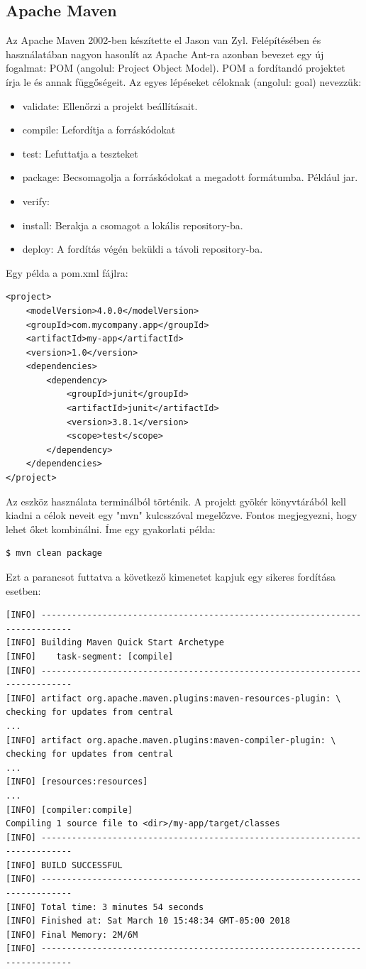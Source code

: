 \documentclass{article}
\begin{document}
\subsection{Apache Maven}\label{subsec:maven}
Az Apache Maven 2002-ben készítette el Jason van Zyl. Felépítésében és használatában nagyon hasonlít az Apache Ant-ra azonban bevezet egy új fogalmat: POM (angolul: Project Object Model). POM a fordítandó projektet írja le és annak függőségeit. Az egyes lépéseket céloknak (angolul: goal) nevezzük:
\begin{itemize}
	\item validate: Ellenőrzi a projekt beállításait.
	\item compile: Lefordítja a forráskódokat
	\item test: Lefuttatja a teszteket
	\item package: Becsomagolja a forráskódokat a megadott formátumba. Például jar.
	\item verify: 
	\item install: Berakja a csomagot a lokális repository-ba.
	\item deploy: A fordítás végén beküldi a távoli repository-ba.
\end{itemize}
Egy példa a pom.xml fájlra:
\begin{lstlisting}
<project>
	<modelVersion>4.0.0</modelVersion>
	<groupId>com.mycompany.app</groupId>
	<artifactId>my-app</artifactId>
	<version>1.0</version>
	<dependencies>
		<dependency>
			<groupId>junit</groupId>
			<artifactId>junit</artifactId>
			<version>3.8.1</version>
			<scope>test</scope>
		</dependency>
	</dependencies>
</project>
\end{lstlisting}
Az eszköz használata terminálból történik. A projekt gyökér könyvtárából kell kiadni a célok neveit egy "mvn" kulcsszóval megelőzve. Fontos megjegyezni, hogy lehet őket kombinálni. Íme egy gyakorlati példa:
\begin{lstlisting}[language=bash]
$ mvn clean package
\end{lstlisting}
Ezt a parancsot futtatva a következő kimenetet kapjuk egy sikeres fordítása esetben: 
\begin{lstlisting}
[INFO] ----------------------------------------------------------------------------
[INFO] Building Maven Quick Start Archetype
[INFO]    task-segment: [compile]
[INFO] ----------------------------------------------------------------------------
[INFO] artifact org.apache.maven.plugins:maven-resources-plugin: \
checking for updates from central
...
[INFO] artifact org.apache.maven.plugins:maven-compiler-plugin: \
checking for updates from central
...
[INFO] [resources:resources]
...
[INFO] [compiler:compile]
Compiling 1 source file to <dir>/my-app/target/classes
[INFO] ----------------------------------------------------------------------------
[INFO] BUILD SUCCESSFUL
[INFO] ----------------------------------------------------------------------------
[INFO] Total time: 3 minutes 54 seconds
[INFO] Finished at: Sat March 10 15:48:34 GMT-05:00 2018
[INFO] Final Memory: 2M/6M
[INFO] ----------------------------------------------------------------------------
\end{lstlisting}
\end{document}
